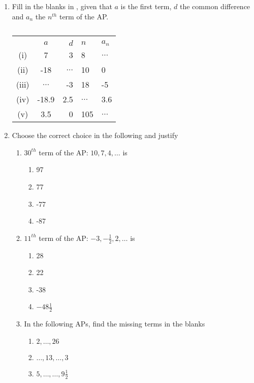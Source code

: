 \begin{enumerate}[label=\thesubsection.\arabic*, ref=\thesubsection.\theenumi]
\item Fill in the blanks in 
	,  given that $a$ is the first term,  $d$ the common
difference and $a_n$ the $n^{th}$ term of the AP.
\begin{table}[H]
	\centering
\begin{tabular}{|c|c|r|l|l|}
\hline
\\
&$a$& $d$ & $n$ & $a_n$
\\
\hline
(i)& 	7 &3 &8 &$\dots $ 
\\
(ii)& 	-18 &$\dots $  &10  &0
\\
(iii)& 	$\dots $  &-3 &18 &-5
\\
(iv)& 	-18.9 &2.5 &$\dots $  &3.6
\\
(v)& 	3.5 &0 &105 &$\dots $ 
\\
\hline
\end{tabular}
	\caption{}
	\label{table:ap}
\end{table}
\item Choose the correct choice in the following and justify 
\begin{enumerate}
	\item $30^{th}$ term of the AP: $10,  7,  4, \dots $   is
	\begin{multicols}{4}
\begin{enumerate}
\item 97
\item 77
\item -77
\item -87
\end{enumerate}
\end{multicols}
\item $11^{th}$ term of the AP: $ -3,  -\frac{1}{2},  2, \dots  $ is 
	\begin{multicols}{4}
\begin{enumerate}
\item 28
\item 22
\item -38
\item $-48\frac{1}{2}$
\end{enumerate}
\end{multicols}
\item In the following APs,  find the missing terms in the blanks  
	\begin{multicols}{2}
\begin{enumerate}
\item $2,  \dots,  26$
\item $\dots  ,  13, \dots  ,  3$
\item $5,  \dots  ,  \dots  ,  9\frac{1}{2}$

\end{enumerate}
\end{multicols}
\end{enumerate}
\end{enumerate}
